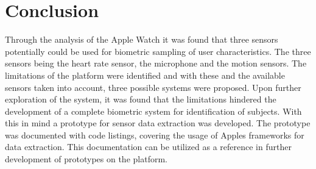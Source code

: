 \section{Conclusion}
Through the analysis of the Apple Watch it was found that three sensors
potentially could be used for biometric sampling of user characteristics. 
The three sensors being the heart rate sensor, the microphone and the motion
sensors. The limitations of the platform were identified and with these and the
available sensors taken into account, three possible systems were proposed.
Upon further exploration of the system, it was found that the limitations
hindered the development of a complete biometric system for identification of
subjects. With this in mind a prototype for sensor data extraction was
developed. The prototype was documented with code listings, covering the usage
of Apples frameworks for data extraction. This documentation can be utilized as
a reference in further development of prototypes on the platform.
